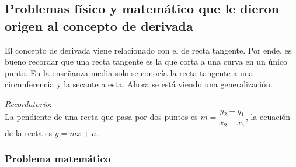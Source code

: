 \documentclass[10pt,twoside]{SelfArx} %
\begin{document}
\subsection{Problemas físico y matemático que le dieron origen al concepto de derivada}
El concepto de derivada viene relacionado con el de recta tangente. Por ende, es bueno recordar que una recta tangente es la que corta a una curva en un único punto. En la enseñanza media solo se conocía la recta tangente a una circunferencia y la secante a esta. Ahora se está viendo una generalización.


\begin{figure}[h]
	\centering
	


	
		\caption{}
\end{figure}


\textsl{Recordatorio}:\\
La pendiente de una recta que pasa por dos puntos es $ m=\dfrac{y_{2}-y_{1}}{x_{2}-x_{1}} $, la ecuación de la recta es $ y=mx+n $.\\
\subsubsection{Problema matemático}
\end{document}
